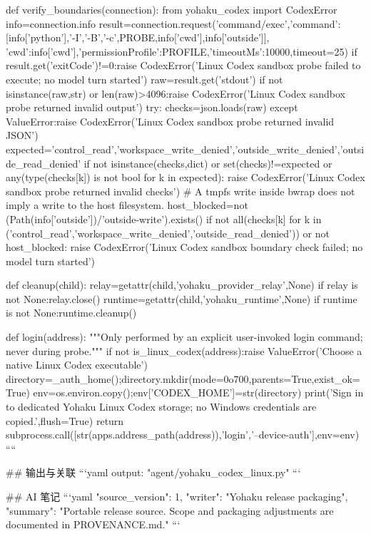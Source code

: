 def verify_boundaries(connection):
    from yohaku_codex import CodexError
    info=connection.info
    result=connection.request('command/exec',{'command':[info['python'],'-I','-B','-c',PROBE,info['cwd'],info['outside']],
        'cwd':info['cwd'],'permissionProfile':PROFILE,'timeoutMs':10000},timeout=25)
    if result.get('exitCode')!=0:raise CodexError('Linux Codex sandbox probe failed to execute; no model turn started')
    raw=result.get('stdout')
    if not isinstance(raw,str) or len(raw)>4096:raise CodexError('Linux Codex sandbox probe returned invalid output')
    try:
        checks=json.loads(raw)
    except ValueError:raise CodexError('Linux Codex sandbox probe returned invalid JSON')
    expected={'control_read','workspace_write_denied','outside_write_denied','outside_read_denied'}
    if not isinstance(checks,dict) or set(checks)!=expected or any(type(checks[k]) is not bool for k in expected):
        raise CodexError('Linux Codex sandbox probe returned invalid checks')
    # A tmpfs write inside bwrap does not imply a write to the host filesystem.
    host_blocked=not (Path(info['outside'])/'outside-write').exists()
    if not all(checks[k] for k in ('control_read','workspace_write_denied','outside_read_denied')) or not host_blocked:
        raise CodexError('Linux Codex sandbox boundary check failed; no model turn started')


def cleanup(child):
    relay=getattr(child,'yohaku_provider_relay',None)
    if relay is not None:relay.close()
    runtime=getattr(child,'yohaku_runtime',None)
    if runtime is not None:runtime.cleanup()


def login(address):
    """Only performed by an explicit user-invoked login command; never during probe."""
    if not is_linux_codex(address):raise ValueError('Choose a native Linux Codex executable')
    directory=_auth_home();directory.mkdir(mode=0o700,parents=True,exist_ok=True)
    env=os.environ.copy();env['CODEX_HOME']=str(directory)
    print('Sign in to dedicated Yohaku Linux Codex storage; no Windows credentials are copied.',flush=True)
    return subprocess.call([str(apps.address_path(address)),'login','--device-auth'],env=env)
````

## 输出与关联
```yaml
output: "agent/yohaku_codex_linux.py"
```

## AI 笔记
```yaml
{"source_version": 1, "writer": "Yohaku release packaging", "summary": "Portable release source. Scope and packaging adjustments are documented in PROVENANCE.md."}
```
